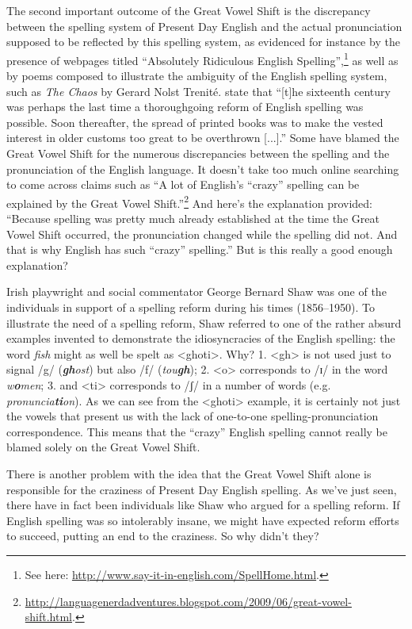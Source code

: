 The second important outcome of the Great Vowel Shift is the discrepancy between the spelling system of Present Day English and the actual pronunciation supposed to be reflected by this spelling system, as evidenced for instance by the presence of webpages titled ``Absolutely Ridiculous English Spelling'',\footnote{See here: \url{http://www.say-it-in-english.com/SpellHome.html}.} as well as by poems composed to illustrate the ambiguity of the English spelling system, such as \emph{The Chaos} by Gerard Nolst Trenité. \citet[231]{MillHay2018} state that ``[t]he sixteenth century was perhaps the last time a thoroughgoing reform of English spelling was possible. Soon thereafter, the spread of printed books was to make the vested interest in older customs too great to be overthrown [...].'' Some have blamed the Great Vowel Shift for the numerous discrepancies between the spelling and the pronunciation of the English language. It doesn't take too much online searching to come across claims such as ``A lot of English's ``crazy'' spelling can be explained by the Great Vowel Shift.''\footnote{\url{http://languagenerdadventures.blogspot.com/2009/06/great-vowel-shift.html}.} And here's the explanation provided: ``Because spelling was pretty much already established at the time the Great Vowel Shift occurred, the pronunciation changed while the spelling did not. And that is why English has such ``crazy'' spelling.'' But is this really a good enough explanation?

Irish playwright and social commentator George Bernard Shaw was one of the individuals in support of a spelling reform during his times (1856--1950). To illustrate the need of a spelling reform, Shaw referred to one of the rather absurd examples invented to demonstrate the idiosyncracies of the English spelling: the word \textit{fish} might as well be spelt as <ghoti>. Why? 1. <gh> is not used just to signal /g/ (\textit{\textbf{gh}ost}) but also /f/ (\textit{tou\textbf{gh}}); 2. <o> corresponds to /ɪ/ in the word \textit{w\textbf{o}men}; 3. and <ti> corresponds to /ʃ/ in a number of words (e.g. \textit{pronuncia\textbf{ti}on}). As we can see from the <ghoti> example, it is certainly not just the vowels that present us with the lack of one-to-one spelling-pronunciation correspondence. This means that the ``crazy'' English spelling cannot really be blamed solely on the Great Vowel Shift.

There is another problem with the idea that the Great Vowel Shift alone is responsible for the craziness of Present Day English spelling. As we've just seen, there have in fact been individuals like Shaw who argued for a spelling reform. If English spelling was so intolerably insane, we might have expected reform efforts to succeed, putting an end to the craziness. So why didn't they?

